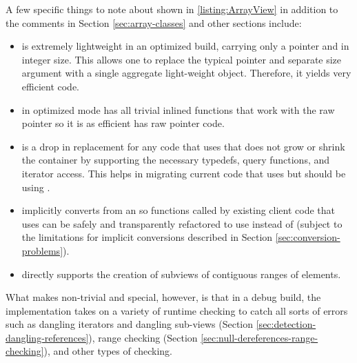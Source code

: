 \documentclass[pdf,ps2pdf,11pt]{SANDreport}
\begin{document}

A few specific things to note about {} shown in
{}\ref{listing:ArrayView} in addition to the comments in Section
{}\ref{sec:array-classes} and other sections include:

\begin{itemize}

{}\item{}{} is extremely lightweight in an optimized build,
carrying only a pointer and in integer size.  This allows one to replace the
typical pointer and separate size argument with a single aggregate
light-weight object.  Therefore, it yields very efficient code.

{}\item{} in optimized mode has all trivial inlined functions
that work with the raw pointer so it is as efficient has raw pointer code.

{}\item{}{} is a drop in replacement for any code that uses
{} that does not grow or shrink the container by supporting
the necessary typedefs, query functions, and iterator access.  This helps in
migrating current code that uses {} but should be using
{}.

{}\item{}{} implicitly converts from an {} so
functions called by existing client code that uses {} can be
safely and transparently refactored to use {} instead of
{} (subject to the limitations for implicit conversions
described in Section {}\ref{sec:conversion-problems}).

{}\item{} directly supports the creation of subviews of
contiguous ranges of elements.

\end{itemize}

What makes {} non-trivial and special, however, is that in a
debug build, the implementation takes on a variety of runtime checking to
catch all sorts of errors such as dangling iterators and dangling sub-views
(Section {}\ref{sec:detection-dangling-references}), range checking (Section
{}\ref{sec:null-dereferences-range-checking}), and other types of checking.
\end{document}
